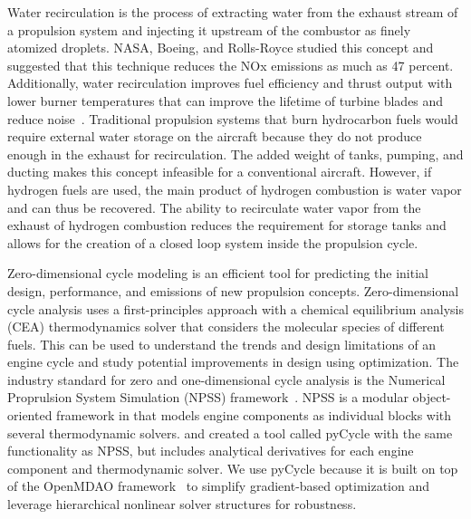 \documentclass[conf]{new-aiaa}
\begin{document}
Water recirculation is the process of extracting water from the exhaust stream of a propulsion system and injecting it upstream of the combustor as finely atomized droplets.
NASA, Boeing, and Rolls-Royce studied this concept and suggested that this technique reduces the NOx emissions as much as 47 percent.
Additionally, water recirculation improves fuel efficiency and thrust output with lower burner temperatures that can improve the lifetime of turbine blades and reduce noise~\cite{nasa_inject}.
Traditional propulsion systems that burn hydrocarbon fuels would require external water storage on the aircraft because they do not produce enough in the exhaust for recirculation.
The added weight of tanks, pumping, and ducting makes this concept infeasible for a conventional aircraft.
However, if hydrogen fuels are used, the main product of hydrogen combustion is water vapor and can thus be recovered.
The ability to recirculate water vapor from the exhaust of hydrogen combustion reduces the requirement for storage tanks and allows for the creation of a closed loop system inside the propulsion cycle.

Zero-dimensional cycle modeling is an efficient tool for predicting the initial design, performance, and emissions of new propulsion concepts.
Zero-dimensional cycle analysis uses a first-principles approach with a chemical equilibrium analysis (CEA) thermodynamics solver that considers the molecular species of different fuels.
This can be used to understand the trends and design limitations of an engine cycle and study potential improvements in design using optimization.
The industry standard for zero and one-dimensional cycle analysis is the Numerical Proprulsion System Simulation (NPSS) framework~\cite{JonesNPSS}.
NPSS is a modular object-oriented framework in that models engine components as individual blocks with several thermodynamic solvers.
\citet{Hendricks2019} and \citet{Gray2017b} created a tool called pyCycle with the same functionality as NPSS, but includes analytical derivatives for each engine component and thermodynamic solver.
We use pyCycle because it is built on top of the OpenMDAO framework~\cite{Gray2019a} to simplify gradient-based optimization and leverage hierarchical nonlinear solver structures for robustness.
\end{document}
